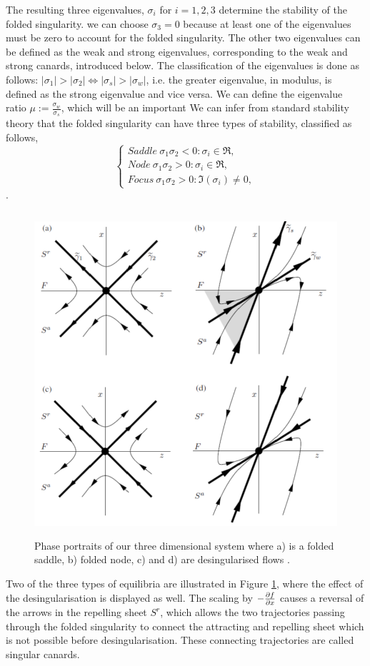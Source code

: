 The resulting three eigenvalues, $ \sigma_i $ for $ i=1,2,3 $ \citep{MMO} determine the stability of the folded singularity. \Wlg we can choose $ \sigma_3=0 $ because at least one of the eigenvalues must be zero to account for the folded singularity.
The other two eigenvalues can be defined as the weak and strong eigenvalues, corresponding to the weak and strong canards, introduced below. The classification of the eigenvalues is done as follows: $ |\sigma_1|>|\sigma_2| \iff |\sigma_s|>|\sigma_w| $, i.e. the greater eigenvalue, in modulus, is defined as the strong eigenvalue and vice versa.
We can define the eigenvalue ratio $\mu:= \frac{\sigma_w}{\sigma_s}$, which will be an important
We can infer from standard stability theory that the folded singularity can have three types of stability, classified as follows,
\begin{equation}
\begin{cases}
Saddle \ \sigma_1\sigma_2<0: \sigma_i\in\Re,\\
Node \ \sigma_1\sigma_2>0: \sigma_i\in\Re,\\
Focus \ \sigma_1\sigma_2>0: \Im(\sigma_i)\neq 0,
\end{cases}
\end{equation}
 \citep{MMO}.
\begin{figure}[h!]\centering
	\includegraphics[height=12cm,width=12cm]{Images/foldednodesetc}
	\caption{Phase portraits of our three dimensional system where a) is a folded saddle, b) folded node, c) and d) are desingularised flows \citep{MMO}.}
	\label{fig: folded singularities}
\end{figure}\newpage%
Two of the three types of equilibria are illustrated in Figure \ref{fig: folded singularities}, where the effect of the desingularisation is displayed as well. The scaling by $-\pd{f}{x}$
causes a reversal of the arrows in the repelling sheet $S^r$, which allows the two trajectories passing through the folded singularity to connect the attracting and repelling sheet which is not possible before desingularisation. These connecting trajectories are called singular canards.


